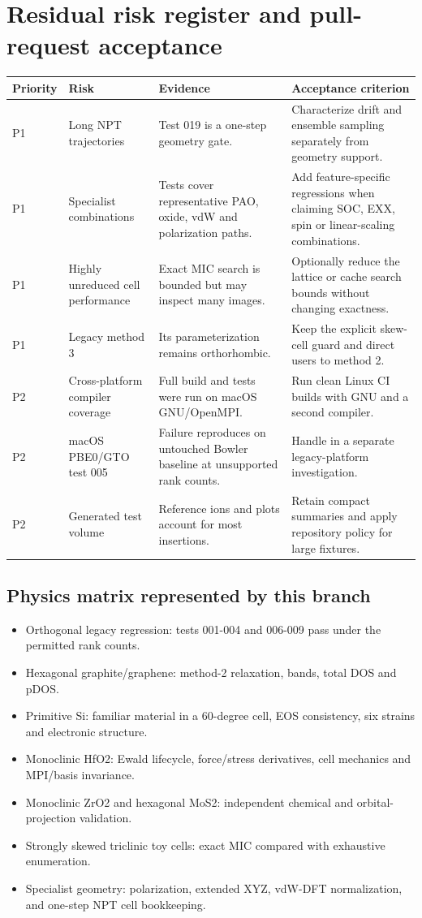 \documentclass[10pt,a4paper]{report}
\begin{document}
\chapter{Residual risk register and pull-request acceptance}
\small\begin{longtable}{p{}|p{}|p{}|p{}}
\toprule Priority & Risk & Evidence & Acceptance criterion\\ \midrule\endhead
P1 & Long NPT trajectories & Test 019 is a one-step geometry gate. & Characterize drift and ensemble sampling separately from geometry support.\\
P1 & Specialist combinations & Tests cover representative PAO, oxide, vdW and polarization paths. & Add feature-specific regressions when claiming SOC, EXX, spin or linear-scaling combinations.\\
P1 & Highly unreduced cell performance & Exact MIC search is bounded but may inspect many images. & Optionally reduce the lattice or cache search bounds without changing exactness.\\
P1 & Legacy method 3 & Its parameterization remains orthorhombic. & Keep the explicit skew-cell guard and direct users to method 2.\\
P2 & Cross-platform compiler coverage & Full build and tests were run on macOS GNU/OpenMPI. & Run clean Linux CI builds with GNU and a second compiler.\\
P2 & macOS PBE0/GTO test 005 & Failure reproduces on untouched Bowler baseline at unsupported rank counts. & Handle in a separate legacy-platform investigation.\\
P2 & Generated test volume & Reference ions and plots account for most insertions. & Retain compact summaries and apply repository policy for large fixtures.\\
\bottomrule\end{longtable}\normalsize
\section{Physics matrix represented by this branch}
\begin{itemize}
\item Orthogonal legacy regression: tests 001-004 and 006-009 pass under the permitted rank counts.
\item Hexagonal graphite/graphene: method-2 relaxation, bands, total DOS and pDOS.
\item Primitive Si: familiar material in a 60-degree cell, EOS consistency, six strains and electronic structure.
\item Monoclinic HfO2: Ewald lifecycle, force/stress derivatives, cell mechanics and MPI/basis invariance.
\item Monoclinic ZrO2 and hexagonal MoS2: independent chemical and orbital-projection validation.
\item Strongly skewed triclinic toy cells: exact MIC compared with exhaustive enumeration.
\item Specialist geometry: polarization, extended XYZ, vdW-DFT normalization, and one-step NPT cell bookkeeping.
\end{itemize}
\end{document}
